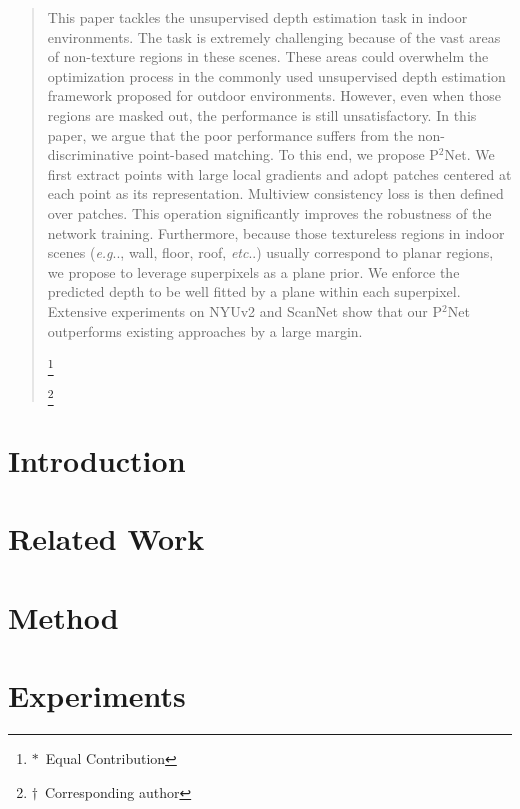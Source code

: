\documentclass[runningheads]{llncs}
\makeatletter
\DeclareRobustCommand\onedot{\futurelet\@let@token\@onedot}
\def\@onedot{\ifx\@let@token.\else.\null\fi\xspace}
\def\eg{\emph{e.g}\onedot} \def\Eg{\emph{E.g}\onedot}
\def\etc{\emph{etc}\onedot} \def\vs{\emph{vs}\onedot}
\makeatother
\begin{document}
\begin{abstract}
This paper tackles the unsupervised depth estimation task in indoor environments. The task is extremely challenging because of the vast areas of non-texture regions in these scenes.
These areas could overwhelm the optimization process in the commonly used unsupervised depth estimation framework proposed for outdoor environments. 
However, even when those regions are masked out, the performance is still unsatisfactory.  
In this paper, we argue that the poor performance suffers from the non-discriminative point-based matching. To this end, we propose P$^2$Net. We first extract points with large local gradients and adopt patches centered at each point as its representation. Multiview consistency loss is then defined over patches. This operation significantly improves the robustness of the network training. 
Furthermore, because those textureless regions in indoor scenes (\eg, wall, floor, roof, \etc) usually correspond to planar regions, 
we propose to leverage superpixels as a plane prior. We enforce the predicted depth to be well fitted by a plane within each superpixel.
Extensive experiments on NYUv2 and ScanNet show that our P$^2$Net outperforms existing approaches by a large margin.

\newcommand\blfootnote[1]{\begingroup
    \renewcommand\thefootnote{}\footnote{#1}\addtocounter{footnote}{-1}\endgroup
}
\blfootnote{$*$~Equal Contribution}
\blfootnote{$\dag$~Corresponding author}
\end{abstract}


\section{Introduction}


\section{Related Work}


\section{Method}


\section{Experiments}

\end{document}
